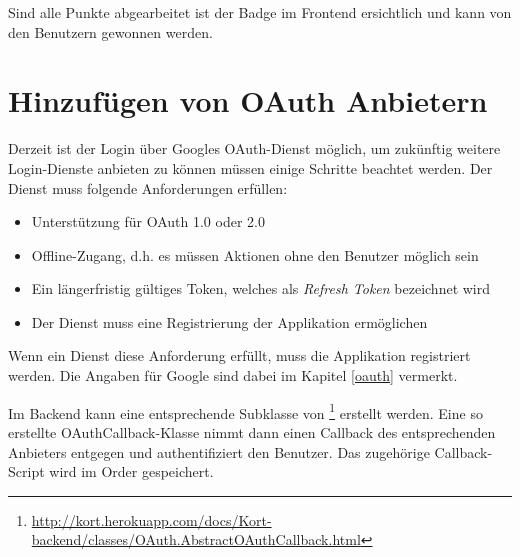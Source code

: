 Sind alle Punkte abgearbeitet ist der Badge im Frontend ersichtlich und kann von den Benutzern gewonnen werden.

\section{Hinzufügen von OAuth Anbietern}
\label{kort-additional-oauth-provider}
Derzeit ist der Login über Googles \gls{OAuth}-Dienst möglich, um zukünftig weitere Login-Dienste anbieten zu können müssen einige Schritte beachtet werden.
Der Dienst muss folgende Anforderungen erfüllen:
\begin{itemize}
\item Unterstützung für OAuth 1.0 oder 2.0
\item Offline-Zugang, d.h. es müssen Aktionen ohne den Benutzer möglich sein
\item Ein längerfristig gültiges Token, welches als \emph{Refresh Token} bezeichnet wird
\item Der Dienst muss eine Registrierung der Applikation ermöglichen
\end{itemize}

Wenn ein Dienst diese Anforderung erfüllt, muss die Applikation registriert werden.
Die Angaben für Google sind dabei im Kapitel \ref{oauth} vermerkt.

Im Backend kann eine entsprechende Subklasse von \footnote{\url{http://kort.herokuapp.com/docs/Kort-backend/classes/OAuth.AbstractOAuthCallback.html}} erstellt werden. 
Eine so erstellte OAuthCallback-Klasse nimmt dann einen Callback des entsprechenden Anbieters entgegen und authentifiziert den Benutzer.
Das zugehörige Callback-Script wird im Order  gespeichert.

